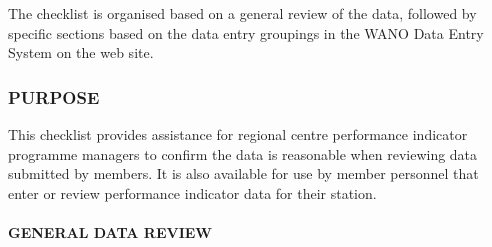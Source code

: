 The checklist is organised based on a general review of the data, followed by
specific sections based on the data entry groupings in the WANO Data Entry
System on the web site.

\subsubsection{PURPOSE}

This checklist provides assistance for regional centre performance indicator
programme managers to confirm the data is reasonable when reviewing data
submitted by members. It is also available for use by member personnel that
enter or review performance indicator data for their station.

\paragraph{GENERAL DATA REVIEW}
